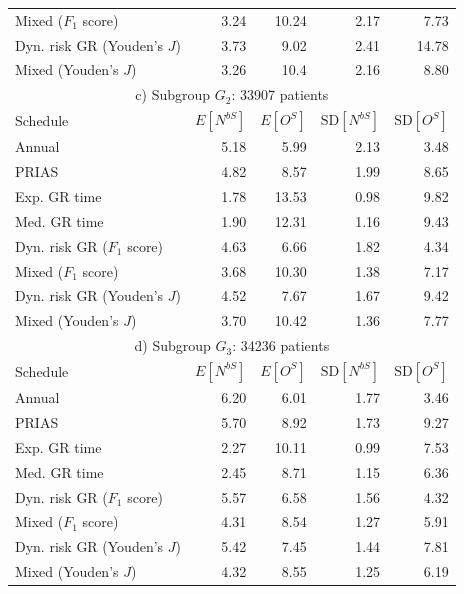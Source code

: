 \begin{table}[!htb]
\begin{tabular}{lrrrr}
Mixed ($F_1$ score)       & 3.24            & 10.24               & 2.17          & 7.73              \\
Dyn. risk GR (Youden's $J$)      & 3.73            & 9.02                & 2.41          & 14.78            \\
Mixed (Youden's $J$)   & 3.26            & 10.4                & 2.16          & 8.80               \\
\hline      
\multicolumn{5}{c}{c) Subgroup $G_2$: 33907 patients}\\
\hline
Schedule        & $E[N^{bS}]$ & $E[O^{S}]$ & ${\mbox{SD}[N^{bS}]}$ & ${\mbox{SD}[O^S]}$ \\
\hline
Annual         & 5.18            & 5.99                & 2.13          & 3.48              \\
PRIAS          & 4.82            & 8.57                & 1.99          & 8.65        \\
Exp. GR time & 1.78            & 13.53               & 0.98          & 9.82              \\
Med. GR time & 1.90             & 12.31               & 1.16          & 9.43              \\
Dyn. risk GR ($F_1$ score)       & 4.63            & 6.66                & 1.82          & 4.34              \\
Mixed ($F_1$ score)       & 3.68            & 10.30                & 1.38          & 7.17              \\
Dyn. risk GR (Youden's $J$)      & 4.52            & 7.67                & 1.67          & 9.42           \\
Mixed (Youden's $J$)   & 3.70             & 10.42               & 1.36          & 7.77              \\
\hline      
\multicolumn{5}{c}{d) Subgroup $G_3$: 34236 patients}\\
\hline
Schedule        & $E[N^{bS}]$ & $E[O^{S}]$ & ${\mbox{SD}[N^{bS}]}$ & ${\mbox{SD}[O^S]}$ \\
\hline
Annual         & 6.20             & 6.01                & 1.77          & 3.46              \\
PRIAS          & 5.70             & 8.92                & 1.73          & 9.27        \\
Exp. GR time & 2.27            & 10.11               & 0.99          & 7.53              \\
Med. GR time & 2.45            & 8.71                & 1.15          & 6.36              \\
Dyn. risk GR ($F_1$ score)       & 5.57            & 6.58                & 1.56          & 4.32              \\
Mixed ($F_1$ score)       & 4.31            & 8.54                & 1.27          & 5.91              \\
Dyn. risk GR (Youden's $J$)      & 5.42            & 7.45                & 1.44          & 7.81  \\        
Mixed (Youden's $J$)   & 4.32            & 8.55                & 1.25          & 6.19              \\
\hline     
\end{tabular}
\end{table}

